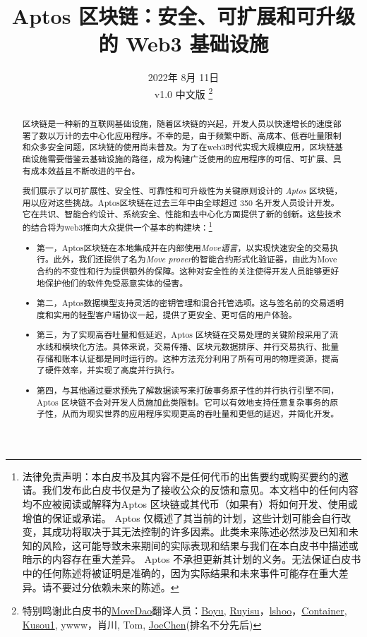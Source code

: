 \documentclass{article}
\title{Aptos 区块链：安全、可扩展和可升级的 Web3 基础设施}
\author{}
\date{2022年 8月 11日\\v1.0 中文版 \footnote{特别鸣谢此白皮书的\href{https://github.com/move-dao}{MoveDao}翻译人员：\href{https://github.com/halfswing}{Boyu}, \href{https://github.com/ruy1su}{Ruyisu}，\href{https://github.com/lshoo}{lshoo}，\href{https://github.com/Container-00}{Container}, \href{https://github.com/Kusou1}{Kusou1}, ywww，肖川, Tom, \href{https://github.com/geometryolife}{JoeChen}(排名不分先后)}}
\begin{document}
\maketitle

\begin{abstract}
{区块链是一种新的互联网基础设施，随着区块链的兴起，开发人员以快速增长的速度部署了数以万计的去中⼼化应⽤程序。不幸的是，由于频繁中断、高成本、低吞吐量限制和众多安全问题，区块链的使用尚未普及。为了在web3时代实现大规模应用，区块链基础设施需要借鉴云基础设施的路径，成为构建⼴泛使⽤的应⽤程序的可信、可扩展、具有成本效益且不断改进的平台。  

我们展⽰了以可扩展性、安全性、可靠性和可升级性为关键原则设计的 \emph{Aptos} 区块链，用以应对这些挑战。Aptos区块链在过去三年中由全球超过 350 名开发⼈员设计开发\cite{aptos_core_github}。它在共识、智能合约设计、系统安全、性能和去中⼼化⽅⾯提供了新的创新。这些技术的结合将为web3推向⼤众提供⼀个基本的构建块：\footnote{法律免责声明：本白皮书及其内容不是任何代币的出售要约或购买要约的邀请。我们发布此白皮书仅是为了接收公众的反馈和意见。本文档中的任何内容均不应被阅读或解释为Aptos 区块链或其代币（如果有）将如何开发、使用或增值的保证或承诺。 Aptos 仅概述了其当前的计划，这些计划可能会自行改变，其成功将取决于其无法控制的许多因素。此类未来陈述必然涉及已知和未知的风险，这可能导致未来期间的实际表现和结果与我们在本白皮书中描述或暗示的内容存在重大差异。 Aptos 不承担更新其计划的义务。无法保证白皮书中的任何陈述将被证明是准确的，因为实际结果和未来事件可能存在重大差异。请不要过分依赖未来的陈述。}
}

\begin{itemize}
 \item 第一，Aptos区块链在本地集成并在内部使用\emph{Move语言}，以实现快速安全的交易执行\cite{move_github}。此外，我们还提供了名为\emph{Move prover}的智能合约形式化验证器，由此为Move合约的不变性和行为提供额外的保障。这种对安全性的关注使得开发人员能够更好地保护他们的软件免受恶意实体的侵害。

 \item 第二，Aptos数据模型支持灵活的密钥管理和混合托管选项。这与签名前的交易透明度和实用的轻型客户端协议一起，提供了更安全、更可信的用户体验。  

 \item 第三，为了实现高吞吐量和低延迟，Aptos 区块链在交易处理的关键阶段采⽤了流⽔线和模块化⽅法。具体来说，交易传播、区块元数据排序、并行交易执行、批量存储和账本认证都是同时运行的。这种方法充分利用了所有可用的物理资源，提高了硬件效率，并实现了高度并行执行。

 \item 第四，与其他通过要求预先了解数据读写来打破事务原子性的并行执行引擎不同，Aptos 区块链不会对开发⼈员施加此类限制。它可以有效地⽀持任意复杂事务的原⼦性，从而为现实世界的应⽤程序实现更⾼的吞吐量和更低的延迟，并简化开发。 


\end{itemize}
\end{abstract}
\end{document}
